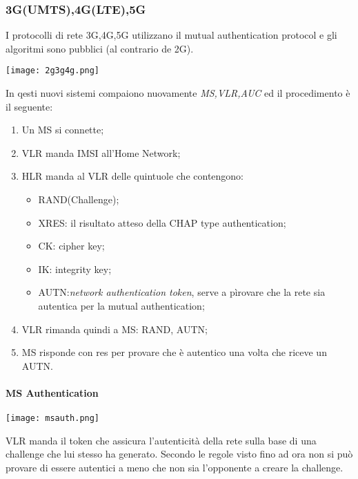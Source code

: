 \documentclass{article}
\theoremstyle{remark}
\begin{document}
\subsubsection{3G(UMTS),4G(LTE),5G}
I protocolli di rete 3G,4G,5G utilizzano il mutual authentication protocol e gli algoritmi sono pubblici (al contrario de 2G). 
\begin{center}
    \texttt{[image: 2g3g4g.png]}
\end{center}
In qesti nuovi sistemi compaiono nuovamente \emph{MS,VLR,AUC} ed il procedimento è il seguente:\begin{enumerate}
    \item Un MS si connette;
    \item VLR manda IMSI all'Home Network;
    \item HLR manda al VLR delle quintuole che contengono:\begin{itemize}
        \item RAND(Challenge);
        \item XRES: il risultato atteso della CHAP type authentication;
        \item CK: cipher key;
        \item IK: integrity key;
        \item AUTN:\emph{network authentication token}, serve a pìrovare che la rete sia autentica per la mutual authentication;
    \end{itemize}
    \item VLR rimanda quindi a MS: RAND, AUTN;
    \item MS risponde con res per provare che è autentico una volta che riceve un AUTN.
\end{enumerate}
\paragraph{MS Authentication}
\begin{center}
    \texttt{[image: msauth.png]}
\end{center}
VLR manda il token che assicura l'autenticità della rete sulla base di una challenge che lui stesso ha generato. Secondo le regole visto fino ad ora non si può provare di essere autentici a meno che non sia l'opponente a creare la challenge.
\end{document}
